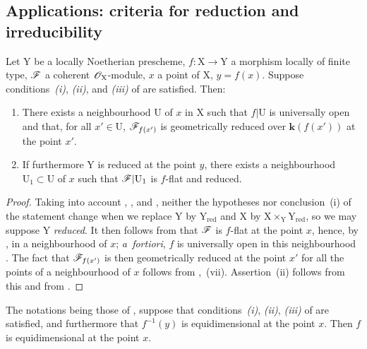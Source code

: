 \subsection{Applications: criteria for reduction and irreducibility}
\label{subsection:IV.15.3}

\begin{proposition}[15.3.1]
\label{IV.15.3.1}
Let $\mathrm{Y}$ be a locally Noetherian prescheme, $f:\mathrm{X}\to\mathrm{Y}$ a morphism locally of finite type, $\mathscr{F}$ a coherent $\mathscr{O}_\mathrm{X}$-module, $x$ a point of $\mathrm{X}$, $y=f(x)$.
Suppose conditions~\emph{(i)}, \emph{(ii)}, and \emph{(iii)} of  are satisfied.
Then:
\begin{enumerate}[label=(\roman*)]
  \item There exists a neighbourhood $\mathrm{U}$ of $x$ in $\mathrm{X}$ such that $f|\mathrm{U}$ is universally open and that, for all $x'\in\mathrm{U}$, $\mathscr{F}_{f(x')}$ is geometrically reduced over $\mathbf{k}(f(x'))$ at the point $x'$.
  \item If furthermore $\mathrm{Y}$ is reduced at the point $y$, there exists a neighbourhood $\mathrm{U}_1\subset\mathrm{U}$ of $x$ such that $\mathscr{F}|\mathrm{U}_1$ is $f$-flat and reduced.
\end{enumerate}
\end{proposition}

\begin{proof}
\label{IV.15.3.1-proof}
Taking into account , , and , neither the hypotheses nor conclusion~(i) of the statement change when we replace $\mathrm{Y}$ by $\mathrm{Y}_\mathrm{red}$ and $\mathrm{X}$ by $\mathrm{X}\times_\mathrm{Y}\mathrm{Y}_\mathrm{red}$, so we may suppose $\mathrm{Y}$ \emph{reduced}.
It then follows from  that $\mathscr{F}$ is $f$-flat at the point $x$, hence, by , in a neighbourhood of $x$; \emph{a~fortiori}, $f$ is universally open in this neighbourhood .
The fact that $\mathscr{F}_{f(x')}$ is then geometrically reduced at the point $x'$
for all the points of a neighbourhood of $x$ follows from ,~(vii).
Assertion~(ii) follows from this and from .
\end{proof}

\begin{proposition}[15.3.2]
\label{IV.15.3.2}
The notations being those of , suppose that conditions~\emph{(i)}, \emph{(ii)}, \emph{(iii)} of  are satisfied, and furthermore that $f^{-1}(y)$ is equidimensional at the point $x$.
Then $f$ is equidimensional at the point $x$.
\end{proposition}


